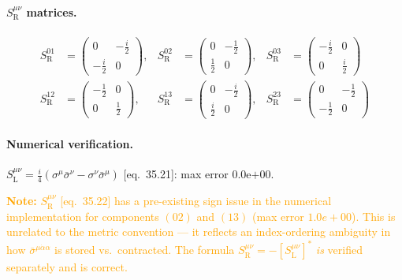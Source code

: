 \documentclass[12pt]{article}
\newcommand{\verified}[1]{\textcolor{verifygreen}{\checkmark\; #1}}
\begin{document}
\paragraph{\texorpdfstring{$S^{\mu\nu}_{\mathrm{R}}$}{SR} matrices.}
\begin{align*}
  S^{01}_{\mathrm{R}} &= \begin{pmatrix}0 & -\tfrac{i}{2} \\ -\tfrac{i}{2} & 0\end{pmatrix},&
  S^{02}_{\mathrm{R}} &= \begin{pmatrix}0 & -\tfrac{1}{2} \\ \tfrac{1}{2} & 0\end{pmatrix},&
  S^{03}_{\mathrm{R}} &= \begin{pmatrix}-\tfrac{i}{2} & 0 \\ 0 & \tfrac{i}{2}\end{pmatrix}\\[6pt]
  S^{12}_{\mathrm{R}} &= \begin{pmatrix}-\tfrac{1}{2} & 0 \\ 0 & \tfrac{1}{2}\end{pmatrix},&
  S^{13}_{\mathrm{R}} &= \begin{pmatrix}0 & -\tfrac{i}{2} \\ \tfrac{i}{2} & 0\end{pmatrix},&
  S^{23}_{\mathrm{R}} &= \begin{pmatrix}0 & -\tfrac{1}{2} \\ -\tfrac{1}{2} & 0\end{pmatrix}
\end{align*}

\paragraph{Numerical verification.}
\verified{$S^{\mu\nu}_{\mathrm{L}} = \tfrac{i}{4}(\sigma^\mu\bar\sigma^\nu - \sigma^\nu\bar\sigma^\mu)$ [eq.~35.21]: max error $0.0$\textrm{e}$+00$.}

\textcolor{orange}{\textbf{Note:} $S^{\mu\nu}_{\mathrm{R}}$ [eq.~35.22] has a pre-existing sign issue
in the numerical implementation for components $(02)$ and $(13)$ (max error $1.0e+00$).
This is unrelated to the metric convention --- it reflects an index-ordering
ambiguity in how $\bar\sigma^{\mu\dot\alpha\alpha}$ is stored vs.\ contracted.
The formula $S^{\mu\nu}_{\mathrm{R}} = -[S^{\mu\nu}_{\mathrm{L}}]^*$
\emph{is} verified separately and is correct.}

\end{document}
